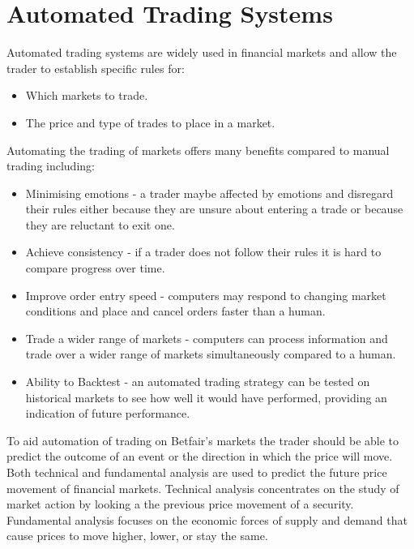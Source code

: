 \section{Automated Trading Systems}
	Automated trading systems are widely used in financial markets and allow the trader to establish specific rules for:
	
	\begin{itemize}
		\item Which markets to trade.
		\item The price and type of trades to place in a market.
	\end{itemize}
	
	Automating the trading of markets offers many benefits compared to manual trading including:
		
	\begin{itemize}
		\item Minimising emotions - a trader maybe affected by emotions and disregard their rules either because they are unsure about entering a trade or because they are reluctant to exit one. 
		\item Achieve consistency - if a trader does not follow their rules it is hard to compare progress over time.
		\item Improve order entry speed - computers may respond to changing market conditions and place and cancel orders faster than a human.
		\item Trade a wider range of markets - computers can process information and trade over a wider range of markets simultaneously compared to a human.
		\item Ability to Backtest - an automated trading strategy can be tested on historical markets to see how well it would have performed, providing an indication of future performance.
	\end{itemize}
	
	To aid automation of trading on Betfair's markets the trader should be able to predict the outcome of an event or the direction in which the price will move.\\
	
	Both technical and fundamental analysis are used to predict the future price movement of financial markets. Technical analysis concentrates on the study of market action by looking a the previous price movement of a security. Fundamental analysis focuses on the economic forces of supply and demand that cause prices to move higher, lower, or stay the same\cite{murphy1999technical}.\\
	
